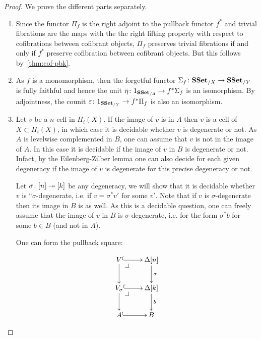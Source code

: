 \documentclass[reqno,10pt,a4paper,oneside,draft]{amsart}
\begin{document}
 
\begin{proof} We prove the different parts separately. 
\begin{enumerate}[$(i)$] 
\item 

Since the functor $\Pi_f$ is the right adjoint to the pullback functor $f^*$ and trivial fibrations are the maps with the the right lifting property with respect to cofibrations between cofibrant objects, $\Pi_f$ preserves trivial fibrations if and only if $f^*$ preserve cofibration between cofibrant objects. But this follows by~\cref{thm:cof-pbk}.

\item As $f$ is a monomorphism, then the forgetful functor $\Sigma_{f} \colon \mathbf{SSet}_{/X} \rightarrow \mathbf{SSet}_{/Y}$ is fully faithful and hence the unit $\eta \colon 1_{\mathbf{SSet}_{/A}} \rightarrow f^* \Sigma_{f}$ is an isomorphism. By adjointness, the counit $\varepsilon \colon 1_{\mathbf{SSet}_{/Y}} \rightarrow f^* \Pi_f$ is also an isomorphism.

\item \hfill 

\begin{center}
\end{center}

Let $v$ be a $n$-cell in $\Pi_i(X)$.
If the image of $v$ is in $A$ then $v$ is a cell of $X \subset \Pi_i(X)$, in which case it is decidable whether $v$ is degenerate or not.
As $A$ is levelwise complemented in $B$, one can assume that $v$ is not in the image of $A$. In this case it is decidable if the image of $v$ in $B$ is degenerate or not.
Infact, by the Eilenberg-Zilber lemma one can also decide for each given degeneracy if the image of $v$ is degenerate for this precise degeneracy or not. 

Let $\sigma \colon [n] \twoheadrightarrow [k]$ be any degeneracy, we will show that it is decidable whether $v$ is ``$\sigma$-degenerate, i.e. if $v =\sigma^* v'$ for some $v'$. Note that if $v$ is $\sigma$-degenerate then its image in $B$ is as well. As this is a decidable question, one can freely assume that the image of $v$ in $B$ is $\sigma$-degenerate, i.e. for the form $\sigma^* b$ for some $b \in B$ (and not in $A$).

 One can form the pullback square:


\[
\xymatrix{
V \ar@{^{(}->}[r] \drpullback \ar[d] & \Delta[n] \ar@{->}[d]^{\sigma} \\
V_{\sigma} \ar@{^{(}->}[r] \drpullback \ar[d] & \Delta[k] \ar@{->}[d]^b \\
A \ar@{^{(}->}[r] &  B }
\]


\end{enumerate}
\end{proof}
\end{document}
